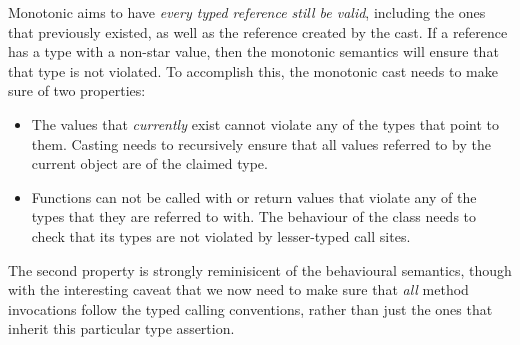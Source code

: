 \documentclass[a4paper,UKenglish,final]{lipics}
\begin{document}
Monotonic aims to have \emph{every typed reference still be valid}, including the ones that previously existed, as well as the reference created by the cast. If a reference has a type with a non-star value, then the monotonic semantics will ensure that that type is not violated. To accomplish this, the monotonic cast needs to make sure of two properties:
\begin{itemize}
\item The values that \emph{currently} exist cannot violate any of the types that point to them. Casting needs to recursively ensure that all values referred to by the current object are of the claimed type.
\item Functions can not be called with or return values that violate any of the types that they are referred to with. The behaviour of the class needs to check that its types are not violated by lesser-typed call sites.
\end{itemize}
The second property is strongly reminisicent of the behavioural semantics, though with the interesting caveat that we now need to make sure that \emph{all} method invocations follow the typed calling conventions, rather than just the ones that inherit this particular type assertion.


\hrulefill

\begin{mathpar}

\end{mathpar}



\hrulefill

\begin{mathpar}



\end{mathpar}
\end{document}
